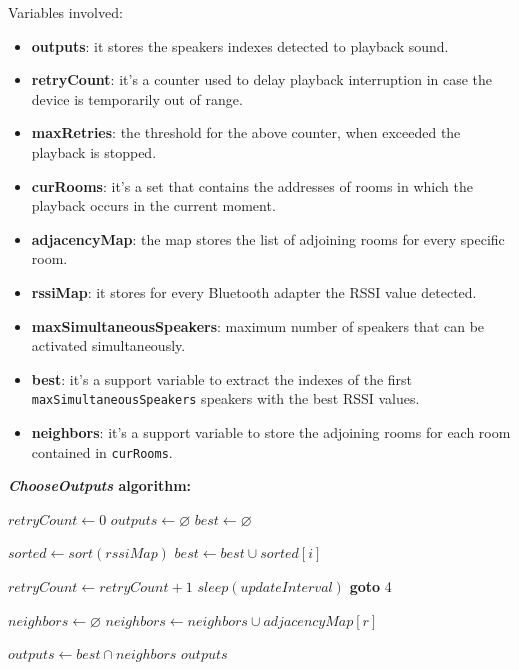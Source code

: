 \documentclass[conference]{IEEEtran}
\begin{document}
Variables involved:
\begin{itemize}
\item \textbf{outputs}: it stores the speakers indexes detected to playback sound.
\item \textbf{retryCount}: it's a counter used to delay playback interruption in case the device is temporarily out of range.
\item \textbf{maxRetries}: the threshold for the above counter, when exceeded the playback is stopped.
\item \textbf{curRooms}: it's a set that contains the addresses of rooms in which the playback occurs in the current moment.
\item \textbf{adjacencyMap}: the map stores the list of adjoining rooms for every specific room.
\item \textbf{rssiMap}: it stores for every Bluetooth adapter the RSSI value detected.
\item \textbf{maxSimultaneousSpeakers}: maximum number of speakers that can be activated simultaneously.
\item \textbf{best}: it's a support variable to extract the indexes of the first \texttt{maxSimultaneousSpeakers} speakers with the best RSSI values.
\item \textbf{neighbors}: it's a support variable to store the adjoining rooms for each room contained in \texttt{curRooms}.
\end{itemize}

\vspace{0.3cm}
\textbf{\textit{ChooseOutputs} algorithm:}
\begin{algorithmic}[1]
\STATE $retryCount \gets 0$
\STATE $outputs \gets \varnothing$
\STATE $best \gets \varnothing$

\STATE $sorted \gets sort(rssiMap)$
	\STATE $best \gets best \cup sorted[i]$
\ENDFOR

	\STATE $retryCount \gets retryCount + 1$
	\STATE $sleep(updateInterval)$
	\STATE \textbf{goto} 4
\ENDIF

\STATE $neighbors \gets \varnothing$
	\STATE $neighbors \gets neighbors \cup adjacencyMap[r]$
\ENDFOR

\STATE $outputs \gets best \cap neighbors$
\RETURN $outputs$
\end{algorithmic}

\end{document}
